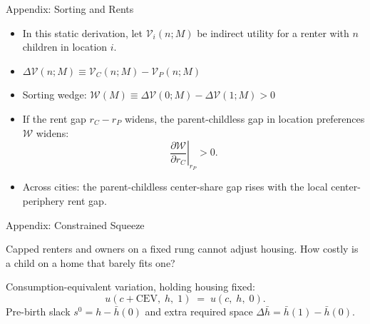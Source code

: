 \documentclass[11pt,aspectratio=169]{beamer}
\begin{document}
\begin{frame}{Appendix: Sorting and Rents \; \hyperlink{acs_sorting_family_space_body}{}}
\label{slide2-main}

\footnotesize
\begin{itemize}
\item In this static derivation, let $\mathcal V_i(n;M)$ be indirect utility
for a renter with $n$ children in location $i$.
\item $\Delta\mathcal V(n;M)\equiv \mathcal V_C(n;M)-\mathcal V_P(n;M)$
\item Sorting wedge: $\mathcal W(M)\equiv\Delta\mathcal V(0;M)-\Delta\mathcal V(1;M)>0$
\item If the rent gap $r_C - r_P$ widens, the parent-childless gap in location preferences $\mathcal W$ widens:
\[
\left.\frac{\partial \mathcal W}{\partial r_C}\right|_{r_P} > 0.
\]
\end{itemize}

\begin{itemize}\setlength\itemsep{-1pt}
  \item Across cities: the parent-childless center-share gap rises with the local center-periphery rent gap.
\end{itemize}

\end{frame}

\begin{frame}{Appendix: Constrained Squeeze \; \hyperlink{app:lem3-cev}{}}
\label{lem3-main}

\footnotesize

Capped renters and owners on a fixed rung cannot adjust housing. How costly is a child on a home that barely fits one?

\vspace{0.2em}
Consumption-equivalent variation, holding housing fixed:
\vspace{-0.4em}
\[
u(c + \mathrm{CEV},\; h,\; 1) \;=\; u(c,\; h,\; 0).
\]
\vspace{-0.6em}
	Pre-birth slack $s^0 = h - \bar h(0)$ and extra required space
	$\Delta\bar h=\bar h(1)-\bar h(0)$.

\vspace{0.2em}
\centering
{}
\end{frame}
\end{document}
